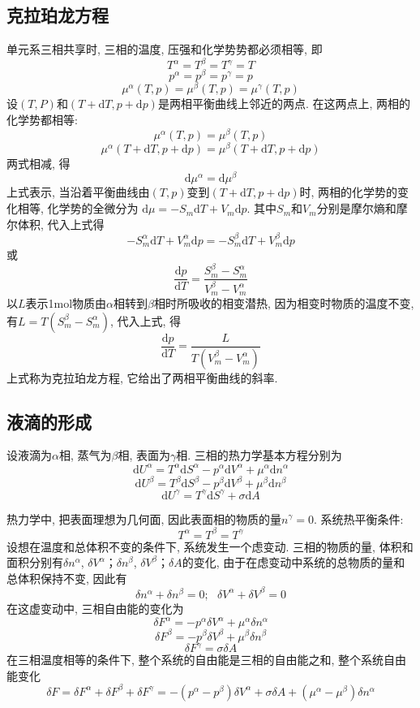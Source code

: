 \subsection{克拉珀龙方程}
单元系三相共享时, 三相的温度, 压强和化学势势都必须相等, 即
$$
    T^\alpha=T^\beta=T^\gamma=T
$$
$$
    p^\alpha=p^\beta=p^\gamma=p
$$
$$
    \mu^\alpha(T,p)=\mu^\beta(T,p)=\mu^\gamma(T,p)
$$
设$(T,P)$和$(T+\mathrm{d}T,p+\mathrm{d}p)$是两相平衡曲线上邻近的两点. 在这两点上, 两相的化学势都相等:
$$
    \mu^\alpha(T,p)=\mu^\beta(T,p)
$$
$$
    \mu^\alpha(T+\mathrm{d}T,p+\mathrm{d}p)=\mu^\beta(T+\mathrm{d}T,p+\mathrm{d}p)
$$
两式相减, 得
$$
    \mathrm{d}\mu^\alpha=\mathrm{d}\mu^\beta
$$
上式表示, 当沿着平衡曲线由$(T,p)$变到$(T+\mathrm{d}T,p+\mathrm{d}p)$时, 两相的化学势的变化相等, 化学势的全微分为
$\mathrm{d}\mu=-S_m\mathrm{d}T+V_m\mathrm{d}p$.
其中$S_m$和$V_m$分别是摩尔熵和摩尔体积, 代入上式得
$$
    -S_m^\alpha\mathrm{d}T+V_m^\alpha\mathrm{d}p=-S_m^\beta\mathrm{d}T+V_m^\beta\mathrm{d}p
$$
或
$$
    \frac{\mathrm{d}p}{\mathrm{d}T}=\frac{S^\beta_m-S^\alpha_m}{V^\beta_m-V^\alpha_m}
$$
以$L$表示1mol物质由$\alpha$相转到$\beta$相时所吸收的相变潜热, 因为相变时物质的温度不变, 有$L=T(S_m^\beta-S_m^\alpha)$, 代入上式, 得
$$
    \frac{\mathrm{d}p}{\mathrm{d}T}=\frac{L}{T(V_m^\beta-V_m^\alpha)}
$$
上式称为克拉珀龙方程, 它给出了两相平衡曲线的斜率.


\subsection{液滴的形成}
设液滴为$\alpha$相, 蒸气为$\beta$相, 表面为$\gamma$相. 三相的热力学基本方程分别为
$$
    \mathrm{d}U^\alpha=T^\alpha\mathrm{d}S^\alpha-p^\alpha\mathrm{d}V^\alpha+\mu^\alpha\mathrm{d}n^\alpha
$$
$$
    \mathrm{d}U^\beta=T^\beta\mathrm{d}S^\beta-p^\beta\mathrm{d}V^\beta+\mu^\beta\mathrm{d}n^\beta
$$
$$
    \mathrm{d}U^\gamma=T^\gamma\mathrm{d}S^\gamma+\sigma\mathrm{d}A
$$

热力学中, 把表面理想为几何面, 因此表面相的物质的量$n^\gamma=0$. 系统热平衡条件:
$$
    T^\alpha=T^\beta=T^\gamma
$$
设想在温度和总体积不变的条件下, 系统发生一个虑变动. 三相的物质的量, 体积和面积分别有$\delta
    n^\alpha$, $\delta V^\alpha$；$\delta n^\beta$, $\delta
    V^\beta$；$\delta
    A$的变化, 由于在虑变动中系统的总物质的量和总体积保持不变, 因此有
$$
    \delta n^\alpha+\delta n^\beta=0; \ \ \ \delta V^\alpha+\delta
    V^\beta=0
$$
在这虚变动中, 三相自由能的变化为
$$
    \delta F^\alpha=-p^\alpha\delta V^\alpha+\mu^\alpha\delta n^\alpha
$$
$$
    \delta F^\beta=-p^\beta\delta V^\beta+\mu^\beta\delta n^\beta
$$
$$
    \delta F^\gamma=\sigma\delta A
$$
在三相温度相等的条件下, 整个系统的自由能是三相的自由能之和, 整个系统自由能变化
$$
    \delta F=\delta F^\alpha+\delta F^\beta+\delta
    F^\gamma=-(p^\alpha-p^\beta)\delta V^\alpha+\sigma\delta
    A+(\mu^\alpha-\mu^\beta)\delta n^\alpha
$$

